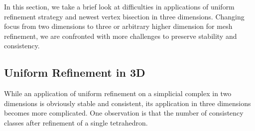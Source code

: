 In this section, we take a brief look at difficulties in applications of uniform refinement strategy and newest vertex bisection in three dimensions. Changing focus from two dimensions to three or arbitrary higher dimension for mesh refinement, we are confronted with more challenges to preserve stability and consistency. 

\subsection{Uniform Refinement in 3D}
While an application of uniform refinement on a simplicial complex in two dimensions is obviously stable and consistent, its application in three dimensions becomes more complicated. One observation is that the number of consistency classes after refinement of a single tetrahedron.

